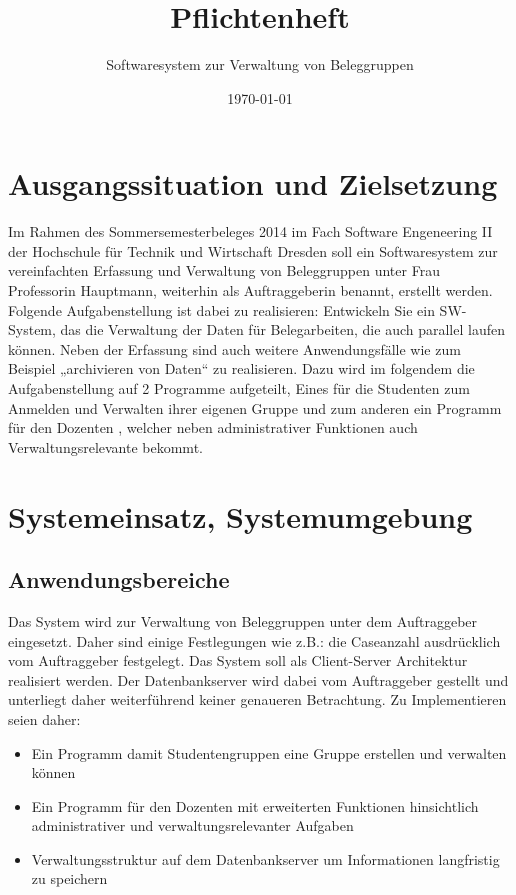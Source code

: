 \documentclass{article}
\begin{document}
\begin{titlepage}
\author{Softwaresystem zur Verwaltung von Beleggruppen} 
\title{Pflichtenheft} 
\date{\today} 
\maketitle
\end{titlepage}
\newpage 
\thispagestyle{empty}
\newpage
\setcounter{page}{1}
\newpage
\tableofcontents
\newpage

\section{Ausgangssituation und Zielsetzung}
Im Rahmen des Sommersemesterbeleges 2014 im Fach Software Engeneering II der Hochschule für Technik und Wirtschaft Dresden soll ein Softwaresystem zur vereinfachten Erfassung und Verwaltung von Beleggruppen unter Frau Professorin Hauptmann, weiterhin als Auftraggeberin benannt, erstellt werden.
Folgende Aufgabenstellung ist dabei zu realisieren:
Entwickeln  Sie ein SW-System, das die Verwaltung der Daten für Belegarbeiten, die auch parallel laufen können. Neben der Erfassung sind auch weitere Anwendungsfälle wie zum Beispiel „archivieren von Daten“ zu realisieren.
Dazu wird im folgendem die Aufgabenstellung auf 2 Programme aufgeteilt, Eines für die Studenten zum Anmelden und Verwalten ihrer eigenen Gruppe und zum anderen ein Programm für den Dozenten , welcher neben administrativer Funktionen auch Verwaltungsrelevante bekommt.

\section{Systemeinsatz, Systemumgebung}
\subsection{Anwendungsbereiche}
Das System wird zur Verwaltung von Beleggruppen unter dem Auftraggeber eingesetzt. Daher sind einige Festlegungen wie z.B.: die Caseanzahl ausdrücklich vom Auftraggeber festgelegt.
Das System soll als Client-Server Architektur realisiert werden. Der Datenbankserver wird dabei vom Auftraggeber gestellt und unterliegt daher weiterführend keiner genaueren Betrachtung. Zu Implementieren seien daher:
\begin{itemize}
\item Ein Programm damit Studentengruppen eine Gruppe erstellen und verwalten können
\item Ein Programm für den Dozenten mit erweiterten Funktionen hinsichtlich administrativer und verwaltungsrelevanter Aufgaben
\item Verwaltungsstruktur auf dem Datenbankserver um Informationen langfristig zu speichern
\end{itemize}
\end{document}
